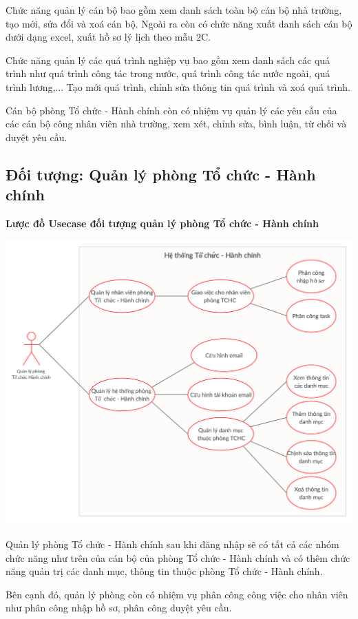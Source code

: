Chức năng quản lý cán bộ bao gồm xem danh sách toàn bộ cán bộ nhà trường, tạo mới, sửa đổi và xoá cán bộ. Ngoài ra còn có chức năng xuất danh sách cán bộ dưới dạng excel, xuất hồ sơ lý lịch theo mẫu 2C.

Chức năng quản lý các quá trình nghiệp vụ bao gồm xem danh sách các quá trình như quá trình công tác trong nước, quá trình công tác nước ngoài, quá trình lương,... Tạo mới quá trình, chỉnh sửa thông tin quá trình và xoá quá trình.

Cán bộ phòng Tổ chức - Hành chính còn có nhiệm vụ quản lý các yêu cầu của các cán bộ công nhân viên nhà trường, xem xét, chỉnh sửa, bình luận, từ chối và duyệt yêu cầu.

\subsection{Đối tượng: Quản lý phòng Tổ chức - Hành chính}
\textbf{Lược đồ Usecase đối tượng quản lý phòng Tổ chức - Hành chính}
\begin{center}
  \captionsetup{type=figure}
  \includegraphics[width=15cm]{img/usecase/quanLyPhong.png}
\end{center}
Quản lý phòng Tổ chức - Hành chính sau khi đăng nhập sẽ có tất cả các nhóm chức năng như trên của cán bộ của phòng Tổ chức - Hành chính và có thêm chức năng quản trị các danh mục, thông tin thuộc phòng Tổ chức - Hành chính.

Bên cạnh đó, quản lý phòng còn có nhiệm vụ phân công công việc cho nhân viên như phân công nhập hồ sơ, phân công duyệt yêu cầu.


